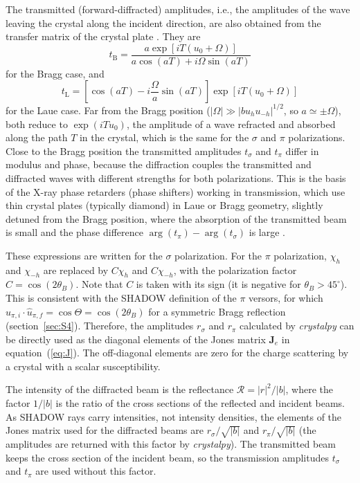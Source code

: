 \documentclass{iucr}
\begin{document}
The transmitted (forward-diffracted) amplitudes, i.e., the amplitudes of the wave leaving the crystal along the incident direction, are also obtained from the transfer matrix of the crystal plate \cite{Guigay2024}. They are
\begin{equation}\label{eq:tbragg}
t_{\mathrm{B}} = \frac{a \exp[iT(u_0+\Omega)]}{a\cos(aT)+i\Omega\sin(aT)}
\end{equation}
for the Bragg case, and
\begin{equation}\label{eq:tlaue}
t_{\mathrm{L}} = \left[\cos(aT) - i\frac{\Omega}{a}\sin(aT)\right] \exp[iT(u_0+\Omega)]
\end{equation}
for the Laue case. Far from the Bragg position ($|\Omega|\gg|bu_hu_{-h}|^{1/2}$, so $a\simeq\pm\Omega$), both reduce to $\exp(iTu_0)$, the amplitude of a wave refracted and absorbed along the path $T$ in the crystal, which is the same for the $\sigma$ and $\pi$ polarizations. Close to the Bragg position the transmitted amplitudes $t_\sigma$ and $t_\pi$ differ in modulus and phase, because the diffraction couples the transmitted and diffracted waves with different strengths for both polarizations. This is the basis of the X-ray phase retarders (phase shifters) working in transmission, which use thin crystal plates (typically diamond) in Laue or Bragg geometry, slightly detuned from the Bragg position, where the absorption of the transmitted beam is small and the phase difference $\arg(t_\pi)-\arg(t_\sigma)$ is large \cite{PolarizationDraft}.

These expressions are written for the $\sigma$ polarization. For the $\pi$ polarization, $\chi_h$ and $\chi_{-h}$ are replaced by $C\chi_h$ and $C\chi_{-h}$, with the polarization factor $C=\cos(2\theta_B)$. Note that $C$ is taken with its sign (it is negative for $\theta_B>45^\circ$). This is consistent with the SHADOW definition of the $\pi$ versors, for which $\hat{u}_{\pi,i}\cdot\hat{u}_{\pi,f}=\cos\Theta=\cos(2\theta_B)$ for a symmetric Bragg reflection (section~\ref{sec:S4}). Therefore, the amplitudes $r_\sigma$ and $r_\pi$ calculated by {\it crystalpy} can be directly used as the diagonal elements of the Jones matrix $\textbf{J}_e$ in equation~(\ref{eq:J}). The off-diagonal elements are zero for the charge scattering by a crystal with a scalar susceptibility.

The intensity of the diffracted beam is the reflectance $\mathcal{R}=|r|^2/|b|$, where the factor $1/|b|$ is the ratio of the cross sections of the reflected and incident beams. As SHADOW rays carry intensities, not intensity densities, the elements of the Jones matrix used for the diffracted beams are $r_\sigma/\sqrt{|b|}$ and $r_\pi/\sqrt{|b|}$ (the amplitudes are returned with this factor by {\it crystalpy}). The transmitted beam keeps the cross section of the incident beam, so the transmission amplitudes $t_\sigma$ and $t_\pi$ are used without this factor.
\end{document}
